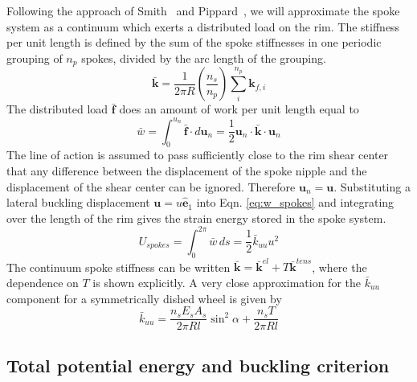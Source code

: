 \documentclass{bmd2016p}
\newcommand{\e}{\ensuremath{\hat{\bm{e}}_1}}
\begin{document}
Following the approach of Smith~\cite{Smith1901a} and Pippard~\cite{Pippard1932d}, we will approximate the spoke system as a continuum which exerts a distributed load on the rim. The stiffness per unit length is defined by the sum of the spoke stiffnesses in one periodic grouping of $n_p$ spokes, divided by the arc length of the grouping.
	\begin{equation}\label{eq:kbar}
	\bar{\bm{k}} = \frac{1}{2\pi R}\left(\frac{n_s}{n_p}\right) \sum_i^{n_p} \bm{k}_{f, i}
	\end{equation}
	The distributed load $\bar{\bm{f}}$ does an amount of work per unit length equal to
	\begin{equation}\label{eq:w_spokes}
	\bar{w} = \int_0^{u_n} \bar{\bm{f}} \cdot d\bm{u}_n = \frac{1}{2} \bm{u}_n \cdot \bar{\bm{k}} \cdot \bm{u}_n
	\end{equation}
The line of action is assumed to pass sufficiently close to the rim shear center that any difference between the displacement of the spoke nipple and the displacement of the shear center can be ignored. Therefore $\bm{u}_n = \bm{u}$. Substituting a lateral buckling displacement $\bm{u}=u\e$ into Eqn. \ref{eq:w_spokes} and integrating over the length of the rim gives the strain energy stored in the spoke system.
	\begin{equation}\label{eq:Us}
	U_{spokes} = \int_0^{2\pi} \bar{w} \, ds = \frac{1}{2} \bar{k}_{uu}u^2
	\end{equation}
The continuum spoke stiffness can be written $\bar{\bm{k}} = \bar{\bm{k}}^{el} + T\bar{\bm{k}}^{tens}$, where the dependence on $T$ is shown explicitly. A very close approximation for the $\bar{k}_{uu}$ component for a symmetrically dished wheel is given by
	\begin{equation}\label{eq:kuu}
	\bar{k}_{uu} = \frac{n_sE_sA_s}{2\pi Rl}\sin^2{\alpha} + \frac{n_s T}{2\pi Rl}
	\end{equation}


\subsection{Total potential energy and buckling criterion}
\end{document}
